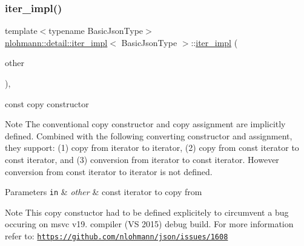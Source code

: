 \subsubsection{\texorpdfstring{iter\+\_\+impl()}{iter\_impl()}\hspace{0.1cm}{\footnotesize\ttfamily [3/4]}}
{\footnotesize\ttfamily template$<$typename Basic\+Json\+Type$>$ \\
\hyperlink{classnlohmann_1_1detail_1_1iter__impl}{nlohmann\+::detail\+::iter\+\_\+impl}$<$ Basic\+Json\+Type $>$\+::\hyperlink{classnlohmann_1_1detail_1_1iter__impl}{iter\+\_\+impl} (\begin{DoxyParamCaption}\item[{const \hyperlink{classnlohmann_1_1detail_1_1iter__impl}{iter\+\_\+impl}$<$ const Basic\+Json\+Type $>$ \&}]{other }\end{DoxyParamCaption})\hspace{0.3cm}{\ttfamily [inline]}, {\ttfamily [noexcept]}}



const copy constructor 

\begin{DoxyNote}{Note}
The conventional copy constructor and copy assignment are implicitly defined. Combined with the following converting constructor and assignment, they support\+: (1) copy from iterator to iterator, (2) copy from const iterator to const iterator, and (3) conversion from iterator to const iterator. However conversion from const iterator to iterator is not defined.
\end{DoxyNote}

\begin{DoxyParams}[1]{Parameters}
\mbox{\tt in}  & {\em other} & const iterator to copy from \\
\hline
\end{DoxyParams}
\begin{DoxyNote}{Note}
This copy constuctor had to be defined explicitely to circumvent a bug occuring on msvc v19. compiler (VS 2015) debug build. For more information refer to\+: \href{https://github.com/nlohmann/json/issues/1608}{\tt https\+://github.\+com/nlohmann/json/issues/1608} 
\end{DoxyNote}
\mbox{\label{classnlohmann_1_1detail_1_1iter__impl_a867f7eb55091be31b013adb3e46816d3}} 
